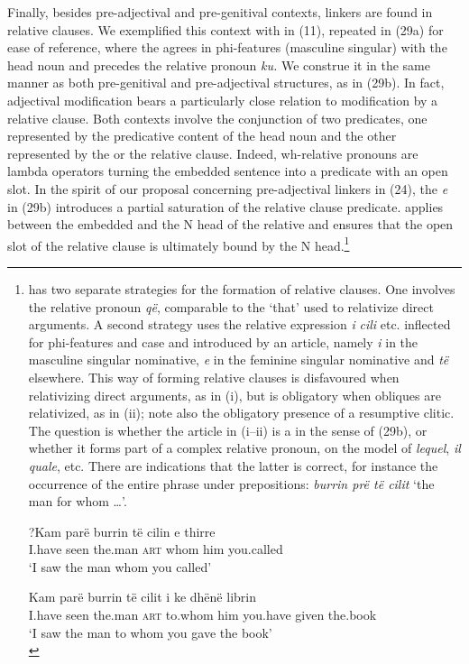 \documentclass[output=paper]{langsci/langscibook}
\begin{document}
  Finally, besides pre-ad\-jec\-ti\-val and pre-genitival contexts, linkers are found in relative clauses. We exemplified this context with   in (11), repeated in (29a) for ease of reference, where the  agrees in phi-features (masculine singular) with the head noun and precedes the relative pronoun \textit{ku.} We construe it in the same manner as both pre-genitival and pre-ad\-jec\-ti\-val  structures, as in (29b). In fact, adjectival modification bears a particularly close relation to modification by a relative clause. Both contexts involve the conjunction of two predicates, one represented by the predicative content of the head noun and the other represented by the  or the relative clause. Indeed, wh-relative pronouns are lambda operators turning the embedded sentence into a predicate with an open slot. In the spirit of our proposal concerning pre-ad\-jec\-ti\-val linkers in (24), the  \textit{e} in (29b) introduces a partial saturation of the relative clause predicate.  applies between the embedded  and the N head of the relative and ensures that the open slot of the relative clause is ultimately bound by the N head.\footnote{ has two separate strategies for the formation of relative clauses. One involves the relative pronoun \textit{që}, comparable to the  ‘that’ used to relativize direct arguments. A second strategy uses the relative expression \textit{i} \textit{cili} etc. inflected for phi-features and case and introduced by an article, namely \textit{i} in the masculine singular nominative, \textit{e} in the feminine singular nominative and \textit{të} elsewhere. This way of forming relative clauses is disfavoured when relativizing direct arguments, as in (i), but is obligatory when obliques are relativized, as in (ii); note also the obligatory presence of a resumptive clitic. The question is whether the article in (i--ii) is a  in the sense of (29b), or whether it forms part of a complex relative pronoun, on the model of  \textit{lequel},  \textit{il quale}, etc. There are indications that the latter is correct, for instance the occurrence of the entire phrase under prepositions: \textit{burrin prë të cilit} ‘the man for whom …’.
  
  \ea   \gll    ?Kam  parë   burrin   të   cilin   e   thirre\\
                I.have   seen   the.man  \textsc{art}   whom  him   you.called\\
  \glt  ‘I saw the man whom you called’
  \z
  
  \ea   \gll    Kam  parë   burrin   të   cilit     i   ke     dhënë   librin\\
                I.have   seen  the.man  \textsc{art}   to.whom    him   you.have   given   the.book\\
        \glt    ‘I saw the man to whom you gave the book’\\
\z}  
\end{document}
